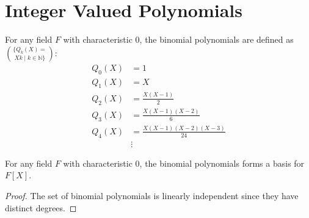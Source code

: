 \section{Integer Valued Polynomials}
\label{sec:integer_valued_polynomial}

\begin{definition}
    For any field $F$ with characteristic $0$, the binomial polynomials are defined as
    $\{ Q_k(X) = \choose X k \mid k \in \mathbb{N} \}$:
    \begin{equation}
        \begin{aligned}
            Q_0(X) &= 1 \\
            Q_1(X) &= X \\
            Q_2(X) &= \frac{X(X-1)}{2} \\
            Q_3(X) &= \frac{X(X-1)(X-2)}{6} \\
            Q_4(X) &= \frac{X(X-1)(X-2)(X-3)}{24} \\
            &\vdots
        \end{aligned}
    \end{equation}
\end{definition}

\begin{lemma}
    For any field $F$ with characteristic $0$, the binomial polynomials forms a basis for $F[X]$.
\end{lemma}
\begin{proof}
    The set of binomial polynomials is linearly independent since they have distinct degrees.
\end{proof}